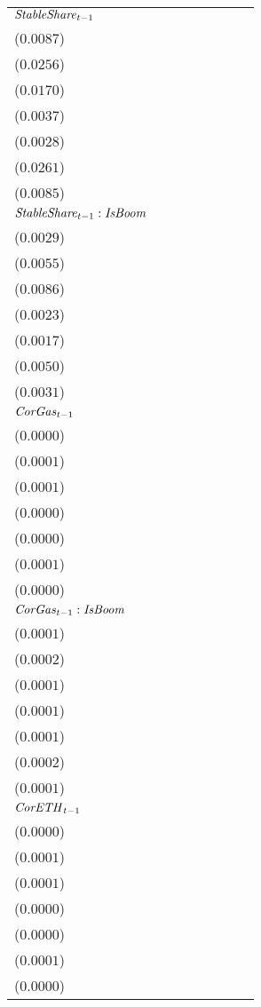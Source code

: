 \begin{tabular}{llllllll}
${\it StableShare}_{t-1}$ & \makecell{$0.0537^{***}$ \\ ($0.0087$)} & \makecell{$0.1449^{***}$ \\ ($0.0256$)} & \makecell{$0.1135^{***}$ \\ ($0.0170$)} & \makecell{$-0.0014^{}$ \\ ($0.0037$)} & \makecell{$-0.0067^{**}$ \\ ($0.0028$)} & \makecell{$0.1377^{***}$ \\ ($0.0261$)} & \makecell{$0.0576^{***}$ \\ ($0.0085$)} \\
${\it StableShare}_{t-1}:{\it IsBoom}$ & \makecell{$-0.0140^{***}$ \\ ($0.0029$)} & \makecell{$-0.0162^{***}$ \\ ($0.0055$)} & \makecell{$-0.0559^{***}$ \\ ($0.0086$)} & \makecell{$-0.0088^{***}$ \\ ($0.0023$)} & \makecell{$-0.0035^{**}$ \\ ($0.0017$)} & \makecell{$-0.0118^{**}$ \\ ($0.0050$)} & \makecell{$-0.0172^{***}$ \\ ($0.0031$)} \\
${\it CorGas}_{t-1}$ & \makecell{$-0.0000^{}$ \\ ($0.0000$)} & \makecell{$-0.0001^{}$ \\ ($0.0001$)} & \makecell{$0.0000^{}$ \\ ($0.0001$)} & \makecell{$0.0000^{}$ \\ ($0.0000$)} & \makecell{$0.0000^{}$ \\ ($0.0000$)} & \makecell{$-0.0001^{}$ \\ ($0.0001$)} & \makecell{$-0.0000^{}$ \\ ($0.0000$)} \\
${\it CorGas}_{t-1}:{\it IsBoom}$ & \makecell{$-0.0001^{}$ \\ ($0.0001$)} & \makecell{$-0.0005^{***}$ \\ ($0.0002$)} & \makecell{$0.0002^{}$ \\ ($0.0001$)} & \makecell{$-0.0001^{}$ \\ ($0.0001$)} & \makecell{$-0.0001^{}$ \\ ($0.0001$)} & \makecell{$-0.0003^{**}$ \\ ($0.0002$)} & \makecell{$-0.0000^{}$ \\ ($0.0001$)} \\
${\it CorETH}_{t-1}$ & \makecell{$0.0000^{}$ \\ ($0.0000$)} & \makecell{$0.0001^{}$ \\ ($0.0001$)} & \makecell{$0.0001^{}$ \\ ($0.0001$)} & \makecell{$0.0000^{}$ \\ ($0.0000$)} & \makecell{$0.0000^{}$ \\ ($0.0000$)} & \makecell{$0.0001^{}$ \\ ($0.0001$)} & \makecell{$0.0000^{}$ \\ ($0.0000$)} \\

\end{tabular}
